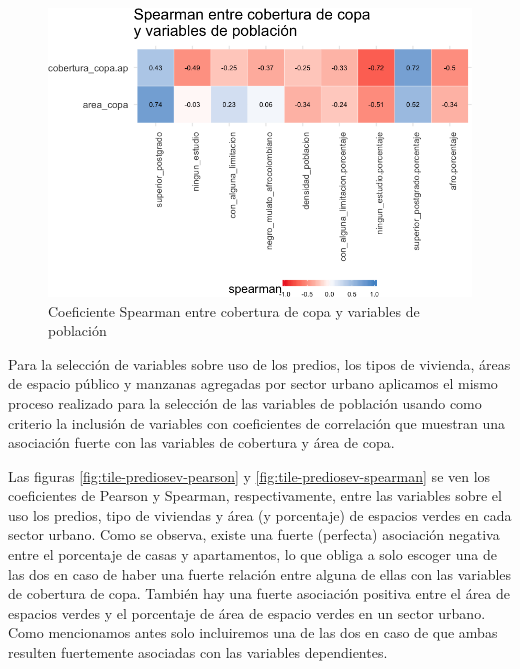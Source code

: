 \documentclass[12pt,]{book}
\begin{document}
\begin{figure}
\includegraphics[width=1\linewidth]{tesis-unigis_files/figure-latex/tile-copa-poblacion-spearman-1} \caption{Coeficiente Spearman entre cobertura de copa
 y variables de población}\label{fig:tile-copa-poblacion-spearman}
\end{figure}

Para la selección de variables sobre uso de los predios, los tipos de
vivienda, áreas de espacio público y manzanas agregadas por sector
urbano aplicamos el mismo proceso realizado para la selección de las
variables de población usando como criterio la inclusión de variables
con coeficientes de correlación que muestran una asociación fuerte con
las variables de cobertura y área de copa.

Las figuras \ref{fig:tile-prediosev-pearson} y
\ref{fig:tile-prediosev-spearman} se ven los coeficientes de Pearson y
Spearman, respectivamente, entre las variables sobre el uso los predios,
tipo de viviendas y área (y porcentaje) de espacios verdes en cada
sector urbano. Como se observa, existe una fuerte (perfecta) asociación
negativa entre el porcentaje de casas y apartamentos, lo que obliga a
solo escoger una de las dos en caso de haber una fuerte relación entre
alguna de ellas con las variables de cobertura de copa. También hay una
fuerte asociación positiva entre el área de espacios verdes y el
porcentaje de área de espacio verdes en un sector urbano. Como
mencionamos antes solo incluiremos una de las dos en caso de que ambas
resulten fuertemente asociadas con las variables dependientes.
\end{document}
